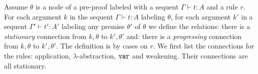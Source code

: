 %
%

%

Assume $\theta$ is a node of a pre-proof labeled with a sequent $\Gamma \vdash t:A$
and a rule $r$. For each argument $k$ in the sequent $\Gamma \vdash t:A$ labeling
$\theta$, for each argument  $k'$ in a sequent $\Gamma' \vdash t':A'$ labeling
any premise $\theta'$ of $\theta$ we define
the relations: there is a \emph{stationary} connection from $k,\theta$ to $k',\theta'$
and: there is a \emph{progressing} connection from $k,\theta$ to $k',\theta'$. 
The definition is by cases on $r$.
We first list the connections for the rules: application, $\lambda$-abstraction, ${\tt var}$
and weakening. Their connections are all stationary.

